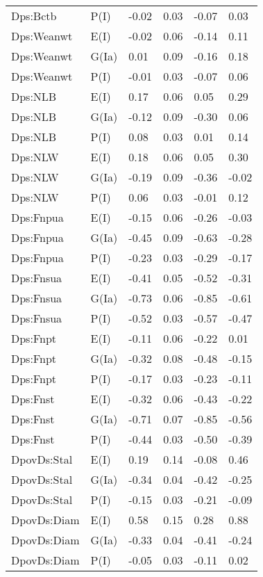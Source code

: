 \begin{center}
\begin{longtable}{|p{1.1in}|p{0.7in}|p{0.7in}|p{0.6in}|p{0.6in}|p{0.6in}|}
  Dps:Bctb & P(I) & -0.02 & 0.03 & -0.07 & 0.03 \\ 
  Dps:Weanwt & E(I) & -0.02 & 0.06 & -0.14 & 0.11 \\ 
  Dps:Weanwt & G(Ia) & 0.01 & 0.09 & -0.16 & 0.18 \\ 
  Dps:Weanwt & P(I) & -0.01 & 0.03 & -0.07 & 0.06 \\ 
  Dps:NLB & E(I) & 0.17 & 0.06 & 0.05 & 0.29 \\ 
  Dps:NLB & G(Ia) & -0.12 & 0.09 & -0.30 & 0.06 \\ 
  Dps:NLB & P(I) & 0.08 & 0.03 & 0.01 & 0.14 \\ 
  Dps:NLW & E(I) & 0.18 & 0.06 & 0.05 & 0.30 \\ 
  Dps:NLW & G(Ia) & -0.19 & 0.09 & -0.36 & -0.02 \\ 
  Dps:NLW & P(I) & 0.06 & 0.03 & -0.01 & 0.12 \\ 
  Dps:Fnpua & E(I) & -0.15 & 0.06 & -0.26 & -0.03 \\ 
  Dps:Fnpua & G(Ia) & -0.45 & 0.09 & -0.63 & -0.28 \\ 
  Dps:Fnpua & P(I) & -0.23 & 0.03 & -0.29 & -0.17 \\ 
  Dps:Fnsua & E(I) & -0.41 & 0.05 & -0.52 & -0.31 \\ 
  Dps:Fnsua & G(Ia) & -0.73 & 0.06 & -0.85 & -0.61 \\ 
  Dps:Fnsua & P(I) & -0.52 & 0.03 & -0.57 & -0.47 \\ 
  Dps:Fnpt & E(I) & -0.11 & 0.06 & -0.22 & 0.01 \\ 
  Dps:Fnpt & G(Ia) & -0.32 & 0.08 & -0.48 & -0.15 \\ 
  Dps:Fnpt & P(I) & -0.17 & 0.03 & -0.23 & -0.11 \\ 
  Dps:Fnst & E(I) & -0.32 & 0.06 & -0.43 & -0.22 \\ 
  Dps:Fnst & G(Ia) & -0.71 & 0.07 & -0.85 & -0.56 \\ 
  Dps:Fnst & P(I) & -0.44 & 0.03 & -0.50 & -0.39 \\ 
  DpovDs:Stal & E(I) & 0.19 & 0.14 & -0.08 & 0.46 \\ 
  DpovDs:Stal & G(Ia) & -0.34 & 0.04 & -0.42 & -0.25 \\ 
  DpovDs:Stal & P(I) & -0.15 & 0.03 & -0.21 & -0.09 \\ 
  DpovDs:Diam & E(I) & 0.58 & 0.15 & 0.28 & 0.88 \\ 
  DpovDs:Diam & G(Ia) & -0.33 & 0.04 & -0.41 & -0.24 \\ 
  DpovDs:Diam & P(I) & -0.05 & 0.03 & -0.11 & 0.02 \\ 

\end{longtable}
\end{center}
